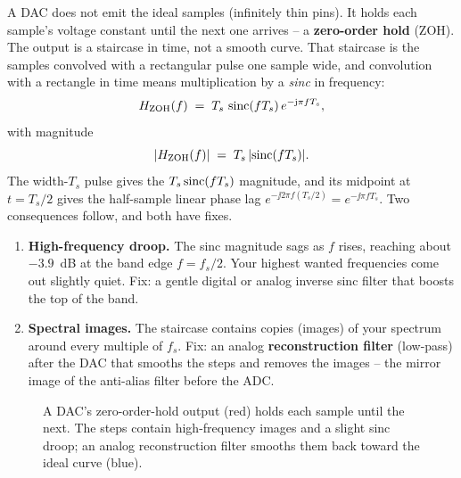 A DAC does not emit the ideal samples (infinitely thin pins). It holds each sample's voltage
constant until the next one arrives -- a \textbf{zero-order hold} (ZOH). The output is a
staircase in time, not a smooth curve. That staircase is the samples convolved with a rectangular
pulse one sample wide, and convolution with a rectangle in time means multiplication by a
\emph{sinc} in frequency:
\[
  H_{\mathrm{ZOH}}(f) \;=\; T_s\,\operatorname{sinc}(f T_s)\, e^{-\mathrm{j} \pi f T_s},
\]
with magnitude
\[
  \lvert H_{\mathrm{ZOH}}(f)\rvert \;=\; T_s\,\lvert\operatorname{sinc}(f T_s)\rvert.
\]
The width-$T_s$ pulse gives the $T_s\operatorname{sinc}(f T_s)$ magnitude, and its midpoint at $t=T_s/2$ gives the half-sample linear phase lag $e^{-\jj 2\pi f(T_s/2)} = e^{-\jj\pi f T_s}$. Two consequences follow, and both have fixes.

\begin{enumerate}
  \item \textbf{High-frequency droop.} The sinc magnitude sags as $f$ rises, reaching about
        $-3.9$~dB at the band edge $f = f_s/2$. Your highest wanted frequencies come out slightly
        quiet. Fix: a gentle digital or analog inverse sinc filter that boosts the top of the band.
  \item \textbf{Spectral images.} The staircase contains copies (images) of your spectrum around
        every multiple of $f_s$. Fix: an analog \textbf{reconstruction filter} (low-pass) after
        the DAC that smooths the steps and removes the images -- the mirror image of the
        anti-alias filter before the ADC.
\end{enumerate}

\begin{figure}[H]
\centering
{}
\caption{A DAC's zero-order-hold output (red) holds each sample until the next. The steps contain
high-frequency images and a slight sinc droop; an analog reconstruction filter smooths them back
toward the ideal curve (blue).}
\label{ch19:fig-zoh}
\end{figure}

